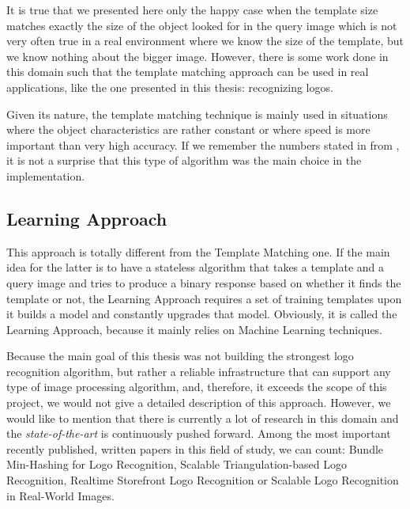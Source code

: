 It is true that we presented here only the happy case when the template size
matches exactly the size of the object looked for in the query image which is
not very often true in a real environment where we know the size of the
template, but we know nothing about the bigger image. However, there is some
work done in this domain \cite{fast-ccorr} \cite{phase-angle} such that the
template matching approach can be used in real applications, like the one
presented in this thesis: recognizing logos.

Given its nature, the template matching technique is mainly used in situations
where the object characteristics are rather constant or where speed is more
important than very high accuracy. If we remember the numbers stated in
 from ,
it is not a surprise that this type of algorithm was the main choice in the implementation.

\subsection{Learning Approach}
This approach is totally different from the Template Matching one. If the main
idea for the latter is to have a stateless algorithm that takes a template and
a query image and tries to produce a binary response based on whether it finds
the template or not, the Learning Approach requires a set of training
templates upon it builds a model and constantly upgrades that model.
Obviously, it is called the Learning Approach, because it mainly relies on
Machine Learning techniques.

Because the main goal of this thesis was not building the strongest logo
recognition algorithm, but rather a reliable infrastructure that can support any
type of image processing algorithm, and, therefore, it exceeds the scope of
this project, we would not give a detailed description of this approach.
However, we would like to mention that there is currently a lot of research in
this domain and the \textit{state-of-the-art} is continuously pushed forward.
Among the most important recently published, written papers in this field of study, we can count:
Bundle Min-Hashing for Logo Recognition\cite{bundle}, Scalable Triangulation-based Logo
Recognition\cite{triang}, Realtime Storefront Logo
Recognition\cite{storefront} or Scalable Logo Recognition
in Real-World Images\cite{real-world}.

